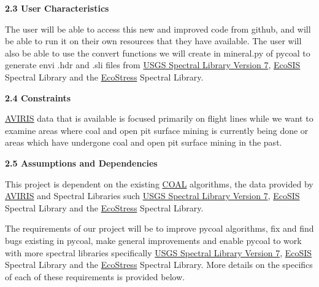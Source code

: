 \documentclass[a4paper,12pt]{article}
\begin{document}
\noindent \textbf{2.3 User Characteristics}\newline


\noindent The user will be able to access this new and improved code from github, and will be able to run it on their own resources that they have available.\newline
\noindent The user will also be able to use the convert functions we will create in mineral.py of pycoal to generate envi .hdr and .sli files from \href{https://speclab.cr.usgs.gov/spectral-lib.html}{USGS Spectral Library Version 7}, \href{https://ecosis.org/}{EcoSIS} Spectral Library and the \href{https://speclib.jpl.nasa.gov/}{EcoStress} Spectral Library. \newline


\noindent \textbf{2.4 Constraints}\newline

\noindent \href{https://aviris.jpl.nasa.gov/}{AVIRIS} data that is available is focused primarily on flight lines while we want to examine areas where coal and open pit surface mining is currently being done or areas which have undergone coal and open pit surface mining in the past. \newline


\noindent \textbf{2.5 Assumptions and Dependencies}\newline


\noindent This project is dependent on the existing \href{https://capstone-coal.github.io/}{COAL} algorithms, the data provided by \href{https://aviris.jpl.nasa.gov/}{AVIRIS} and Spectral Libraries such \href{https://speclab.cr.usgs.gov/spectral-lib.html}{USGS Spectral Library Version 7}, \href{https://ecosis.org/}{EcoSIS} Spectral Library and the \href{https://speclib.jpl.nasa.gov/}{EcoStress} Spectral Library.\newline


\newline


\noindent  The requirements of our project will be to improve pycoal algorithms, fix and find bugs existing in pycoal, make general improvements and enable pycoal to work with more spectral libraries specifically \href{https://speclab.cr.usgs.gov/spectral-lib.html}{USGS Spectral Library Version 7}, \href{https://ecosis.org/}{EcoSIS} Spectral Library and the \href{https://speclib.jpl.nasa.gov/}{EcoStress} Spectral Library. More details on the specifics of each of these requirements is provided below. \newline
\end{document}
